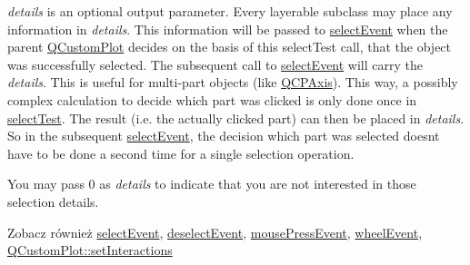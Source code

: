 {\itshape details} is an optional output parameter. Every layerable subclass may place any information in {\itshape details}. This information will be passed to \hyperlink{class_q_c_p_layerable_a7498c2d0d081cf7cad0fb3bb93aa0e91}{select\+Event} when the parent \hyperlink{class_q_custom_plot}{Q\+Custom\+Plot} decides on the basis of this select\+Test call, that the object was successfully selected. The subsequent call to \hyperlink{class_q_c_p_layerable_a7498c2d0d081cf7cad0fb3bb93aa0e91}{select\+Event} will carry the {\itshape details}. This is useful for multi-\/part objects (like \hyperlink{class_q_c_p_axis}{Q\+C\+P\+Axis}). This way, a possibly complex calculation to decide which part was clicked is only done once in \hyperlink{class_q_c_p_layerable_a4001c4d0dfec55598efa4d531f2179a9}{select\+Test}. The result (i.\+e. the actually clicked part) can then be placed in {\itshape details}. So in the subsequent \hyperlink{class_q_c_p_layerable_a7498c2d0d081cf7cad0fb3bb93aa0e91}{select\+Event}, the decision which part was selected doesn\textquotesingle{}t have to be done a second time for a single selection operation.

You may pass 0 as {\itshape details} to indicate that you are not interested in those selection details.

\begin{DoxySeeAlso}{Zobacz również}
\hyperlink{class_q_c_p_layerable_a7498c2d0d081cf7cad0fb3bb93aa0e91}{select\+Event}, \hyperlink{class_q_c_p_layerable_ae546370644a5551c76af739afc008bee}{deselect\+Event}, \hyperlink{class_q_c_p_layerable_af6567604818db90f4fd52822f8bc8376}{mouse\+Press\+Event}, \hyperlink{class_q_c_p_layerable_a47dfd7b8fd99c08ca54e09c362b6f022}{wheel\+Event}, \hyperlink{class_q_custom_plot_a5ee1e2f6ae27419deca53e75907c27e5}{Q\+Custom\+Plot\+::set\+Interactions} 
\end{DoxySeeAlso}


